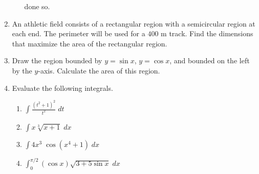 \documentclass[12pt]{article}
\newcommand{\ds}{\displaystyle}
\begin{document}
\begin{enumerate}
\begin{enumerate}
    done so.
\vfill
  \end{enumerate}
\newpage
\item An 
  athletic field consists of a rectangular region with a semicircular region
  at each end.  The perimeter will be used for a $400$ m track.  Find the
  dimensions that maximize the area of the rectangular region.
\vfill
\item Draw
  the region bounded by $y=\sin x$, $y=\cos x$, and bounded on the left by
  the $y$-axis.  Calculate the area of this region.
\vfill
\newpage
\item Evaluate 
  the following integrals.
  \begin{enumerate}
  \item $\ds \int \frac{(t^2+1)^2}{t^2} \; dt$
\vfill
  \item $\ds \int x \sqrt[3]{x+1} \; dx$
\vfill
  \item $\ds \int 4x^3 \; \cos(x^4+1) \; dx$
\vfill
  \item $\ds \int_0^{\pi/2} (\cos x) \sqrt{3+5\sin x} \; dx$
\vfill
  \end{enumerate}
\end{enumerate}
\end{document}
